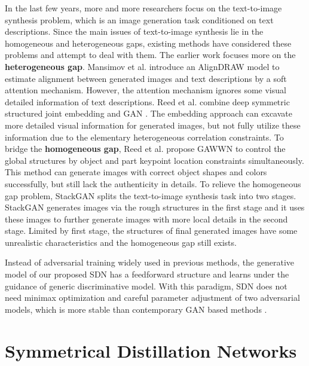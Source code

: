 \documentclass[sigconf]{acmart}
\begin{document}
In the last few years, more and more researchers focus on the text-to-image synthesis problem, which is an image generation task conditioned on text descriptions. Since the main issues of text-to-image synthesis lie in the homogeneous and heterogeneous gaps, existing methods have considered these problems and attempt to deal with them. The earlier work focuses more on the \textbf{heterogeneous gap}.
Mansimov et al. \cite{mansimov2015generating} introduce an AlignDRAW model to estimate alignment between generated images and text descriptions by a soft attention mechanism. However, the attention mechanism ignores some visual detailed information of text descriptions.
Reed et al. \cite{reed2016generative} combine deep symmetric structured joint embedding \cite{reed2016learning} and GAN \cite{goodfellow2014generative}. The embedding approach can excavate more detailed visual information for generated images, but not fully utilize these information due to the elementary heterogeneous correlation constraints. 
To bridge the \textbf{homogeneous gap}, Reed et al. \cite{reed2016gawwn} propose GAWWN to control the global structures by object and part keypoint location constraints simultaneously. This method can generate images with correct object shapes and colors successfully, but still lack the authenticity in details. To relieve the homogeneous gap problem, StackGAN \cite{zhang2016stackgan} splits the text-to-image synthesis task into two stages. StackGAN generates images via the rough structures in the first stage and it uses these images to further generate images with more local details in the second stage. Limited by first stage, the structures of final generated images have some unrealistic characteristics and the homogeneous gap still exists.

Instead of adversarial training widely used in previous methods, the generative model of our proposed SDN has a feedforward structure and learns under the guidance of generic discriminative model. With this paradigm, SDN does not need minimax optimization and careful parameter adjustment of two adversarial models, which is more stable than contemporary GAN based methods \cite{arjovsky2017towards}. 


\section{Symmetrical Distillation Networks}
\end{document}
